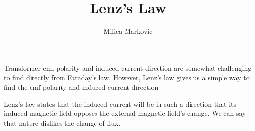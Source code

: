 \documentclass{ximera}
\title{Lenz's Law}
\author{Milica Markovic}
\begin{document}
  
\begin{abstract}  

\end{abstract}  
\maketitle    

Transformer emf polarity and induced current direction are somewhat challenging to find directly from Faraday's law. However, Lenz's law gives us a simple way to find the emf polarity and induced current direction.

Lenz's law states that the induced current will be in such a direction that its induced magnetic field opposes the external magnetic field's change. We can say that nature dislikes the change of flux.
\end{document}
